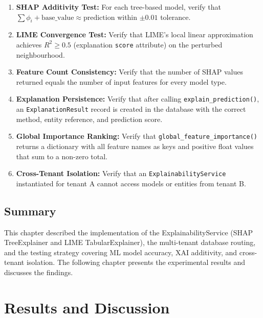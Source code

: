 \documentclass[12pt,a4paper]{report}
\begin{document}
\begin{enumerate}[label=\arabic*.]
  \item \textbf{SHAP Additivity Test:} For each tree-based model, verify that $\sum \phi_i + \text{base\_value} \approx \text{prediction}$ within $\pm 0.01$ tolerance.

  \item \textbf{LIME Convergence Test:} Verify that LIME's local linear approximation achieves $R^2 \geq 0.5$ (explanation \texttt{score} attribute) on the perturbed neighbourhood.

  \item \textbf{Feature Count Consistency:} Verify that the number of SHAP values returned equals the number of input features for every model type.

  \item \textbf{Explanation Persistence:} Verify that after calling \texttt{explain\_prediction()}, an \texttt{ExplanationResult} record is created in the database with the correct method, entity reference, and prediction score.

  \item \textbf{Global Importance Ranking:} Verify that \texttt{global\_feature\_importance()} returns a dictionary with all feature names as keys and positive float values that sum to a non-zero total.

  \item \textbf{Cross-Tenant Isolation:} Verify that an \texttt{ExplainabilityService} instantiated for tenant A cannot access models or entities from tenant B.
\end{enumerate}

\section{Summary}
\label{sec:impl_summary}

This chapter described the implementation of the ExplainabilityService (SHAP TreeExplainer and LIME TabularExplainer), the multi-tenant database routing, and the testing strategy covering ML model accuracy, XAI additivity, and cross-tenant isolation. The following chapter presents the experimental results and discusses the findings.


%
%
\chapter{Results and Discussion}
\label{ch:results}
\end{document}
